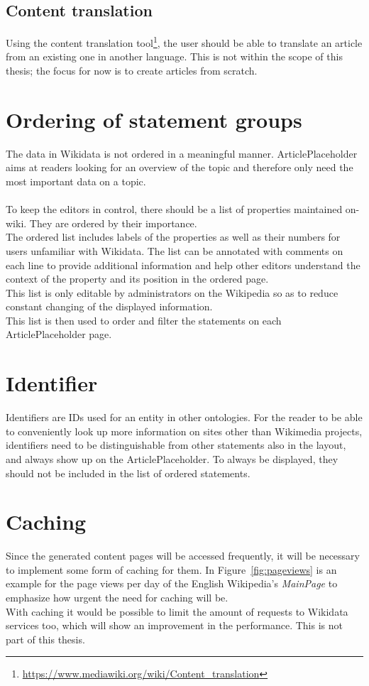 \subsection{Content translation}
Using the content translation tool\footnote{\url{https://www.mediawiki.org/wiki/Content_translation}}, the user should be able to translate an article from an existing one in another language. This is not within the scope of this thesis; the focus for now is to create articles from scratch. \\

\section{Ordering of statement groups}
The data in Wikidata is not ordered in a meaningful manner. ArticlePlaceholder aims at readers looking for an overview of the topic and therefore only need the most important data on a topic. \\
\\
To keep the editors in control, there should be a list of properties maintained on-wiki. They are ordered by their importance. \\
The ordered list includes labels of the properties as well as their numbers for users unfamiliar with Wikidata. The list can be annotated with comments on each line to provide additional information and help other editors understand the context of the property and its position in the ordered page. \\
This list is only editable by administrators on the Wikipedia so as to reduce constant changing of the displayed information. \\
This list is then used to order and filter the statements on each ArticlePlaceholder page. 

\section {Identifier}
Identifiers are IDs used for an entity in other ontologies. For the reader to be able to conveniently look up more information on sites other than Wikimedia projects, identifiers need to be distinguishable from other statements also in the layout, and always show up on the ArticlePlaceholder. To always be displayed, they should not be included in the list of ordered statements. 

\section{Caching}
Since the generated content pages will be accessed frequently, it will be necessary to implement some form of caching for them. In Figure~\ref{fig:pageviews} is an example for the page views per day of the English Wikipedia's \textit{MainPage} to emphasize how urgent the need for caching will be. \\
With caching it would be possible to limit the amount of requests to Wikidata services too, which will show an improvement in the performance. This is not part of this thesis.

